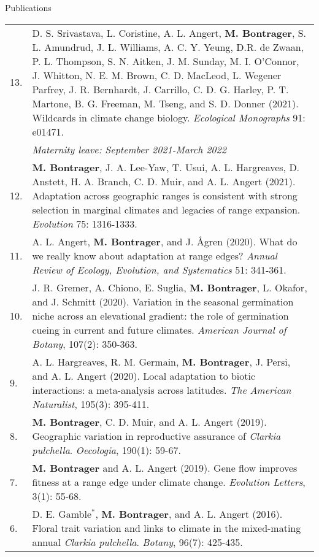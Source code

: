 \documentclass[letterpaper,11pt,oneside]{article}
\begin{document}

\noindent\Large{Publications}  
\normalsize
\medskip

\def\arraystretch{1.4}
\noindent \begin{tabular}{@{} p{0.5cm} >{\raggedright\arraybackslash}p{16.7cm}}

13. & D. S. Srivastava, L. Coristine, A. L. Angert, \textbf{M. Bontrager}, S. L. Amundrud, J. L. Williams, A. C. Y. Yeung, D.R. de Zwaan, P. L. Thompson, S. N. Aitken, J. M. Sunday, M. I. O'Connor, J. Whitton, N. E. M. Brown, C. D. MacLeod, L. Wegener Parfrey, J. R. Bernhardt, J. Carrillo, C. D. G. Harley, P. T. Martone, B. G. Freeman, M. Tseng, and S. D. Donner (2021). Wildcards in climate change biology. \textit{Ecological Monographs} 91: e01471. \\ 
& \textit{Maternity leave: September 2021-March 2022} \\
12. & \textbf{M. Bontrager}, J. A. Lee-Yaw, T. Usui, A. L. Hargreaves, D. Anstett, H. A. Branch, C. D. Muir, and A. L. Angert (2021). Adaptation across geographic ranges is consistent with strong selection in marginal climates and legacies of range expansion. \textit{Evolution} 75: 1316-1333. \\
11. & A. L. Angert, \textbf{M. Bontrager}, and J. \AA gren (2020). What do we really know about adaptation at range edges? \textit{Annual Review of Ecology, Evolution, and Systematics} 51: 341-361. \\
10. & J. R. Gremer, A. Chiono, E. Suglia, \textbf{M. Bontrager}, L. Okafor, and J. Schmitt (2020). Variation in the seasonal germination niche across an elevational gradient: the role of germination cueing in current and future climates. \textit{American Journal of Botany}, 107(2): 350-363. \\
9. & A. L. Hargreaves, R. M. Germain, \textbf{M. Bontrager}, J. Persi, and A. L. Angert (2020). Local adaptation to biotic interactions: a meta-analysis across latitudes. \textit{The American Naturalist}, 195(3): 395-411. \\
8. & \textbf{M. Bontrager}, C. D. Muir, and A. L. Angert (2019). Geographic variation in reproductive assurance of \textit{Clarkia pulchella}. \textit{Oecologia}, 190(1): 59-67. \\
7. & \textbf{M. Bontrager} and A. L. Angert (2019). Gene flow improves fitness at a range edge under climate change. \textit{Evolution Letters}, 3(1): 55-68. \\
6. & D. E. Gamble$^{*}$, \textbf{M. Bontrager}, and A. L. Angert (2016). Floral trait variation and links to climate in the mixed-mating annual \textit{Clarkia pulchella}. \textit{Botany}, 96(7): 425-435. \\

\end{tabular}
\end{document}
